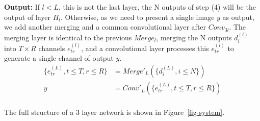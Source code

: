 \vspace{1mm}
\noindent
\textbf{Output:} If $l < L$, this is not the last layer, the N outputs of step (4) will be the output of layer $H_l$. Otherwise, as we need to present a single image $y$ as output, we add another merging and a common convolutional layer after $Conv_{3l}$. The merging layer is identical to the previous $Merge_l$, merging the N outputs $d_i^{(l)}$ into $T\times R$ channels $e_{tr}^{(l)}$, and a convolutional layer processes this $e_{tr}^{(l)}$ to generate a single channel of output $y$. 
\begin{equation}\label{eq:7}
    \begin{split}
        \{e_{tr}^{(L)},t\le T,r\le R\} &= Merge'_{L}(\{d_i^{(L)},i\le N\})\\
        y &= Conv'_{L}(\{e_{tr}^{(L)},t\le T,r\le R\} )\\
\end{split}
\end{equation}

The full structure of a 3 layer network is shown in Figure~\ref{fig-system}.




